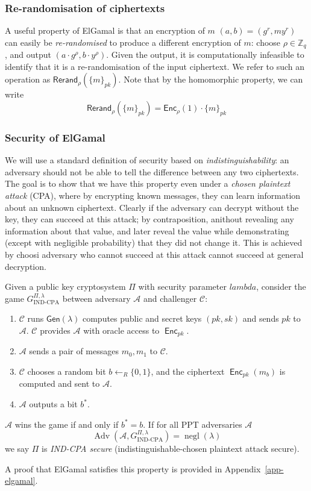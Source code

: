 \documentclass[12pt,a4paper]{article}
\DeclareMathOperator{\negl}{\text{negl}}
\DeclareMathOperator{\Adv}{\text{Adv}}
\DeclareMathOperator{\Enc}{\mathsf{Enc}}
\theoremstyle{definition}
\begin{document}
\subsubsection{Re-randomisation of ciphertexts}
A useful property of ElGamal is that an encryption of $m$ $(a, b)=(g^r, my^r)$ can easily be \textit{re-randomised} to produce a different encryption of $m$: choose $\rho\in\mathbb{Z}_q$, and output $(a\cdot g^\rho, b\cdot y^\rho)$. Given the output, it is computationally infeasible to identify that it is a re-randomisation of the input ciphertext. We refer to such an operation as $\mathsf{Rerand}_\rho(\{m\}_{pk})$. Note that by the homomorphic property, we can write
$$\mathsf{Rerand}_\rho(\{m\}_{pk})=\mathsf{Enc}_{\rho}(1)\cdot\{m\}_{pk}$$

\subsubsection{Security of ElGamal}
We will use a standard definition of security based on \textit{indistinguishability}: an adversary should not be able to tell the difference between any two ciphertexts. The goal is to show that we have this property even under a \textit{chosen plaintext attack} (CPA), where by encrypting known messages, they can learn information about an unknown ciphertext. Clearly if the adversary can decrypt without the key, they can succeed at this attack; by contraposition, anithout revealing any information about that value, and later reveal the value while demonstrating (except with negligible probability) that they did not change it. This is achieved by choosi adversary who cannot succeed at this attack cannot succeed at general decryption.

\begin{definition}
    Given a public key cryptosystem $\Pi$ with security parameter $lambda$, consider the game $G_{\text{IND-CPA}}^{\Pi,\lambda}$ between adversary $\mathcal{A}$ and challenger $\mathcal{C}$:
    \begin{enumerate}
        \item $\mathcal{C}$ runs $\mathsf{Gen}(\lambda)$ computes public and secret keys $(pk, sk)$ and sends $pk$ to $\mathcal{A}$. $\mathcal{C}$ provides $\mathcal{A}$ with oracle access to $\Enc_{pk}$.
        \item $\mathcal{A}$ sends a pair of messages $m_0, m_1$ to $\mathcal{C}$.
        \item $\mathcal{C}$ chooses a random bit $b\gets_R\{0, 1\}$, and the ciphertext $\Enc_{pk}(m_b)$ is computed and sent to $\mathcal{A}$.
        \item $\mathcal{A}$ outputs a bit $b^*$.
    \end{enumerate}
    $\mathcal{A}$ wins  the game if and only if $b^*=b$. If for all PPT adversaries $\mathcal{A}$
    $$\Adv\left(\mathcal{A},G^{\Pi,\lambda}_{\text{IND-CPA}}\right)=\negl(\lambda)$$
    we say $\Pi$ is \textit{IND-CPA secure} (indistinguishable-chosen plaintext attack secure).
\end{definition}
A proof that ElGamal satisfies this property is provided in Appendix~\ref{app-elgamal}.
\end{document}
